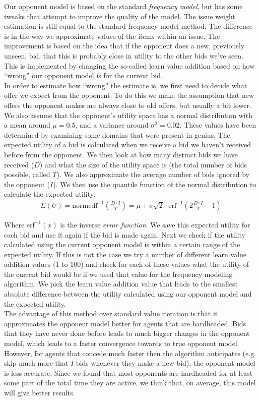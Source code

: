 Our opponent model is based on the standard \emph{frequency model}, but has some tweaks that attempt to improve the quality of the model. The issue weight estimation is still equal to the standard frequency model method. The difference is in the way we approximate values of the items within an issue. The improvement is based on the idea that if the opponent does a new, previously unseen, bid, that this is probably close in utility to the other bids we've seen. This is implemented by changing the so-called learn value addition based on how ``wrong'' our opponent model is for the current bid. \\

In order to estimate how ``wrong'' the estimate is, we first need to decide what offer we expect from the opponent. To do this we make the assumption that new offers the opponent makes are always close to old offers, but usually a bit lower. We also assume that the opponent's utility space has a normal distribution with a mean around $\mu = 0.5$, and a variance around $\sigma^2 = 0.02$. These values have been determined by examining some domains that were present in genius. The expected utility of a bid is calculated when we receive a bid we haven't received before from the opponent. We then look at how many distinct bids we have received ($D$) and what the size of the utility space is (the total number of bids possible, called $T$). We also approximate the average number of bids ignored by the opponent ($I$). We then use the quantile function of the normal distribution to calculate the expected utility:
\begin{align}
  E(U) = \text{normcdf}^{-1} \left(\frac{D \cdot I}{T}\right) = \mu + \sigma \sqrt{2} \cdot \text{erf}^{-1} \left(2 \frac{D \cdot I}{T} - 1\right)
\end{align}

Where $\text{erf}^{-1}(x)$ is the inverse \emph{error function}. We save this expected utility for each bid and use it again if the bid is made again. Next we check if the utility calculated using the current opponent model is within a certain range of the expected utility. If this is not the case we try a number of different learn value addition values ($1$ to $100$) and check for each of these values what the utility of the current bid would be if we used that value for the frequency modeling algorithm. We pick the learn value addition value that leads to the smallest absolute difference between the utility calculated using our opponent model and the expected utility. \\

The advantage of this method over standard value iteration is that it approximates the opponent model better for agents that are hardheaded. Bids that they have never done before leads to much bigger changes in the opponent model, which leads to a faster convergence towards to true opponent model. However, for agents that concede much faster then the algorithm anticipates (e.g. skip much more that $I$ bids whenever they make a new bid), the opponent model is less accurate. Since we found that most opponents are hardheaded for at least some part of the total time they are active, we think that, on average, this model will give better results.